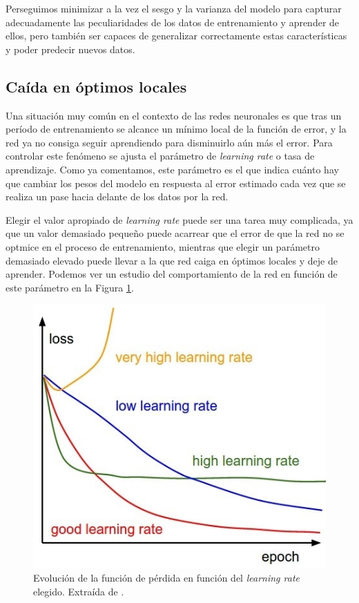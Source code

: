 \documentclass[
  a4paper,
  12pt,
  spanish,
]{scrartcl}
\theoremstyle{teorema-style}
\begin{document}
Perseguimos minimizar a la vez el sesgo y la varianza del modelo para capturar adecuadamente las peculiaridades de los datos de entrenamiento y aprender de ellos, pero también ser capaces de generalizar correctamente estas características y poder predecir nuevos datos.

\subsection{Caída en óptimos locales}

Una situación muy común en el contexto de las redes neuronales es que tras un período de entrenamiento se alcance un mínimo local de la función de error, y la red ya no consiga seguir aprendiendo para disminuirlo aún más el error. Para controlar este fenómeno se ajusta el parámetro de \textit{learning rate} o tasa de aprendizaje. Como ya comentamos, este parámetro es el que indica cuánto hay que cambiar los pesos del modelo en respuesta al error estimado cada vez que se realiza un pase hacia delante de los datos por la red.

Elegir el valor apropiado de \textit{learning rate} puede ser una tarea muy complicada, ya que un valor demasiado pequeño puede acarrear que el error de que la red no se optmice en el proceso de entrenamiento, mientras que elegir un parámetro demasiado elevado puede llevar a la que red caiga en óptimos locales y deje de aprender. Podemos ver un estudio del comportamiento de la red en función de este parámetro en la Figura \ref{fig:learning-rate}.

\begin{figure}[h]
  \centering
  \includegraphics[width=.65\textwidth]{img/learning-rate}
  \caption{Evolución de la función de pérdida en función del \textit{learning rate} elegido. Extraída de \parencite{quora_lr_2017}.}
  \label{fig:learning-rate}
\end{figure}
\end{document}
